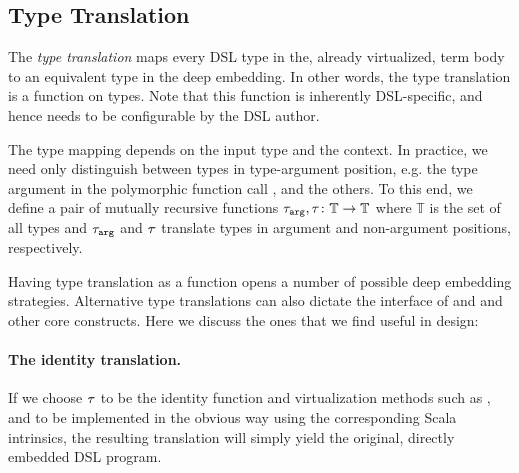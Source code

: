 \subsection{Type Translation}
\label{sec:type-translation}
 The \emph{type translation} maps every DSL type in the, already
  virtualized, term body to an equivalent type in the deep embedding.
  In other words, the type translation is a function on
  types.  Note that this function is inherently DSL-specific, and
  hence needs to be configurable by the DSL author.


  The type mapping depends on the input type and the context. In
  practice, we need only distinguish between types in type-argument
  position, e.g. the type argument  in the polymorphic
  function call , and the others.  To this end, we
  define a pair of mutually recursive functions $\ttarg, \ttother
  \colon \mathbb{T} \rightarrow \mathbb{T}$ where $\mathbb{T}$ is the
  set of all types and $\ttarg$ and $\ttother$ translate types in
  argument and non-argument positions, respectively.

  Having type translation as a function opens a number of possible deep embedding
   strategies. Alternative type translations can also dictate the interface of 
   and  and other core \edsl{} constructs. Here we discuss the ones that we find
   useful in \edsl{} design:

\paragraph{The identity translation.}  If we choose $\ttother$ to be
the identity function and virtualization methods such as ,
 and  to be implemented in the obvious way
using the corresponding Scala intrinsics, the resulting translation
will simply yield the original, directly embedded DSL program.

